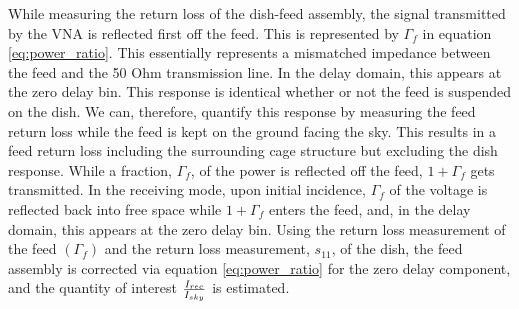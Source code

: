 \documentclass[twocolumn]{emulateapj}
\begin{document}

While measuring the return loss of the dish-feed assembly, the signal transmitted by the VNA is reflected first off the feed. This is represented by $\Gamma_{f}$ in equation \ref{eq:power_ratio}. This essentially represents a mismatched impedance between the feed and the 50 Ohm transmission line. In the delay domain, this appears at the zero delay bin. This response is identical whether or not the feed is suspended on the dish. We can, therefore, quantify this response by measuring the feed return loss while the feed is kept on the ground facing the sky. This results in a feed return loss including the surrounding cage structure but excluding the dish response. While a fraction, $\Gamma_{f}$, of the power is reflected off the feed, $1+\Gamma_{f}$ gets transmitted. In the receiving mode, upon initial incidence, $\Gamma_{f}$ of the voltage is reflected back into free space while $1+\Gamma_{f}$ enters the feed, and, in the delay domain, this appears at the zero delay bin. Using the return loss measurement of the feed $(\Gamma_{f})$ and the return loss measurement, $s_{11}$, of the dish, the feed assembly is corrected via equation \ref{eq:power_ratio} for the zero delay component, and the quantity of interest ${I_{rec}\over I_{sky}}$ is estimated. 
%
%
\end{document}
